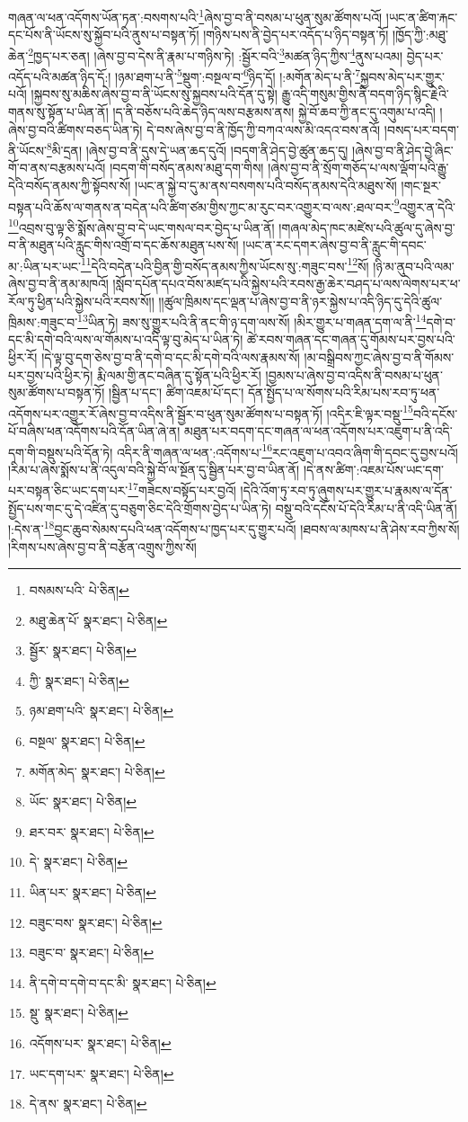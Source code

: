 གཞན་ལ་ཕན་འདོགས་ཡོན་ཏན་:བསགས་པའི་\footnote{བསམས་པའི་  པེ་ཅིན། }ཞེས་བྱ་བ་ནི་བསམ་པ་ཕུན་སུམ་ཚོགས་པའོ། །ཡང་ན་ཚིག་རྐང་དང་པོས་ནི་ཡོངས་སུ་སྐྱོབ་པའི་ནུས་པ་བསྟན་ཏོ། །གཉིས་པས་ནི་བྱེད་པར་འདོད་པ་ཉིད་བསྟན་ཏོ། །ཁྱོད་ཀྱི་:མཐུ་ཆེན་\footnote{མཐུ་ཆེན་པོ་  སྣར་ཐང་།  པེ་ཅིན། }ཁྱད་པར་ཅན། །ཞེས་བྱ་བ་དེས་ནི་རྣམ་པ་གཉིས་ཏེ། :སྦྱོར་བའི་\footnote{སྦྱོར་  སྣར་ཐང་།  པེ་ཅིན། }མཚན་ཉིད་ཀྱིས་\footnote{ཀྱི་  སྣར་ཐང་།  པེ་ཅིན། }ནུས་པའམ། བྱེད་པར་འདོད་པའི་མཚན་ཉིད་དོ:། །ཉམ་ཐག་པ་ནི་\footnote{ཉམ་ཐག་པའི་  སྣར་ཐང་།  པེ་ཅིན། }སྡུག་:བསྔལ་བ་\footnote{བསྔལ་  སྣར་ཐང་།  པེ་ཅིན། }ཉིད་དོ། །:མགོན་མེད་པ་ནི་\footnote{མགོན་མེད་  སྣར་ཐང་།  པེ་ཅིན། }སྐྱབས་མེད་པར་གྱུར་པའོ། །སྐྱབས་སུ་མཆིས་ཞེས་བྱ་བ་ནི་ཡོངས་སུ་སྐྱབས་པའི་དོན་དུ་སྟེ། རྒྱུ་འདི་གསུམ་གྱིས་ནི་བདག་ཉིད་སྙིང་རྗེའི་གནས་སུ་སྟོན་པ་ཡིན་ནོ། །ད་ནི་བཅོས་པའི་ཆེད་ཉིད་ལས་བརྩམས་ནས། སྐྱེ་བོ་ཆབ་ཀྱི་ནང་དུ་འགུམ་པ་འདི། །ཞེས་བྱ་བའི་ཚིགས་བཅད་ཡིན་ཏེ། དེ་བས་ཞེས་བྱ་བ་ནི་ཁྱོད་ཀྱི་བཀའ་ལས་མི་འདའ་བས་ནའོ། །བསད་པར་བདག་ནི་ཡོངས་\footnote{ཡོང་  སྣར་ཐང་།  པེ་ཅིན། }མི་དྲན། །ཞེས་བྱ་བ་ནི་དུས་དེ་ཡན་ཆད་དུའོ། །བདག་ནི་ཤེད་བྱེ་ཚུན་ཆད་དུ། །ཞེས་བྱ་བ་ནི་ཤེད་བྱེ་ཞིང་གོ་བ་ནས་བརྩམས་པའོ། །བདག་གི་བསོད་ནམས་མཐུ་དག་གིས། །ཞེས་བྱ་བ་ནི་སྲོག་གཅོད་པ་ལས་ལྡོག་པའི་རྒྱུ་དེའི་བསོད་ནམས་ཀྱི་སྟོབས་སོ། །ཡང་ན་སྐྱེ་བ་དུ་མ་ནས་བསགས་པའི་བསོད་ནམས་དེའི་མཐུས་སོ། །གང་སྔར་བསྟན་པའི་ཆོས་ལ་གནས་ན་བདེན་པའི་ཚིག་ཙམ་གྱིས་ཀྱང་མ་རུང་བར་འགྱུར་བ་ལས་:ཐལ་བར་\footnote{ཐར་བར་  སྣར་ཐང་།  པེ་ཅིན། }འགྱུར་ན་དེའི་\footnote{དེ་  སྣར་ཐང་།  པེ་ཅིན། }འབྲས་བུ་ལྟ་ཅི་སྨོས་ཞེས་བྱ་བ་དེ་ཡང་གསལ་བར་བྱེད་པ་ཡིན་ནོ། །གཞལ་མེད་ཁང་མཛེས་པའི་ཚུལ་དུ་ཞེས་བྱ་བ་ནི་མཐུན་པའི་རླུང་གིས་འགྲོ་བ་དང་ཆོས་མཐུན་པས་སོ། །ཡང་ན་རང་དགར་ཞེས་བྱ་བ་ནི་རླུང་གི་དབང་མ་:ཡིན་པར་ཡང་\footnote{ཡིན་པར་  སྣར་ཐང་།  པེ་ཅིན། }དེའི་བདེན་པའི་བྱིན་གྱི་བསོད་ནམས་ཀྱིས་ཡོངས་སུ་:གཟུང་བས་\footnote{བཟུང་བས་  སྣར་ཐང་།  པེ་ཅིན། }སོ། །ཉི་མ་ནུབ་པའི་ལམ་ཞེས་བྱ་བ་ནི་ནམ་མཁའོ། །སློབ་དཔོན་དཔའ་བོས་མཛད་པའི་སྐྱེས་པའི་རབས་རྒྱ་ཆེར་བཤད་པ་ལས་ལེགས་པར་ཕ་རོལ་ཏུ་ཕྱིན་པའི་སྐྱེས་པའི་རབས་སོ།། །།ཚུལ་ཁྲིམས་དང་ལྡན་པ་ཞེས་བྱ་བ་ནི་ཉར་སྐྱེས་པ་འདི་ཉིད་དུ་དེའི་ཚུལ་ཁྲིམས་:གཟུང་བ་\footnote{བཟུང་བ་  སྣར་ཐང་།  པེ་ཅིན། }ཡིན་ཏེ། ཟས་སུ་གྱུར་པའི་ནི་ནང་གི་ཉ་དག་ལས་སོ། །མིར་གྱུར་པ་གཞན་དག་ལ་ནི་\footnote{ནི་དགེ་བ་དགེ་བ་དང་མི་  སྣར་ཐང་།  པེ་ཅིན། }དགེ་བ་དང་མི་དགེ་བའི་ལས་ལ་གོམས་པ་འདི་ལྟ་བུ་མེད་པ་ཡིན་ཏེ། ཚེ་རབས་གཞན་དང་གཞན་དུ་གོམས་པར་བྱས་པའི་ཕྱིར་རོ། །དེ་ལྟ་བུ་དག་ཅེས་བྱ་བ་ནི་དགེ་བ་དང་མི་དགེ་བའི་ལས་རྣམས་སོ། །མ་བསྒྲིབས་ཀྱང་ཞེས་བྱ་བ་ནི་གོམས་པར་བྱས་པའི་ཕྱིར་ཏེ། རྨི་ལམ་གྱི་ནང་བཞིན་དུ་སྟོན་པའི་ཕྱིར་རོ། །བྱམས་པ་ཞེས་བྱ་བ་འདིས་ནི་བསམ་པ་ཕུན་སུམ་ཚོགས་པ་བསྟན་ཏོ། །སྦྱིན་པ་དང་། ཚིག་འཇམ་པོ་དང་། དོན་སྤྱོད་པ་ལ་སོགས་པའི་རིམ་པས་རབ་ཏུ་ཕན་འདོགས་པར་འགྱུར་རོ་ཞེས་བྱ་བ་འདིས་ནི་སྦྱོར་བ་ཕུན་སུམ་ཚོགས་པ་བསྟན་ཏོ། །འདིར་ཇི་ལྟར་བསྡུ་\footnote{སྡུ་  སྣར་ཐང་།  པེ་ཅིན། }བའི་དངོས་པོ་བཞིས་ཕན་འདོགས་པའི་དོན་ཡིན་ཞེ་ན། མཐུན་པར་བདག་དང་གཞན་ལ་ཕན་འདོགས་པར་འཇུག་པ་ནི་འདི་དག་གི་བསྡུས་པའི་དོན་ཏེ། འདིར་ནི་གཞན་ལ་ཕན་:འདོགས་པ་\footnote{འདོགས་པར་  སྣར་ཐང་།  པེ་ཅིན། }རང་འཇུག་པ་འབའ་ཞིག་གི་དབང་དུ་བྱས་པའོ། །རིམ་པ་ཞེས་སྨོས་པ་ནི་འདུལ་བའི་སྐྱེ་བོ་ལ་སྔོན་དུ་སྦྱིན་པར་བྱ་བ་ཡིན་ནོ། །དེ་ནས་ཚིག་:འཇམ་པོས་ཡང་དག་པར་བསྟན་ཅིང་ཡང་དག་པར་\footnote{ཡང་དག་པར་  སྣར་ཐང་།  པེ་ཅིན། }གཟེངས་བསྟོད་པར་བྱའོ། །དེའི་འོག་ཏུ་རབ་ཏུ་ཞུགས་པར་གྱུར་པ་རྣམས་ལ་དོན་སྤྱོད་པས་གང་དུ་དེ་འཛིན་དུ་བཅུག་ཅིང་དེའི་གྲོགས་བྱེད་པ་ཡིན་ཏེ། བསྡུ་བའི་དངོས་པོ་དེའི་རིམ་པ་ནི་འདི་ཡིན་ནོ། །:དེས་ན་\footnote{དེ་ནས་  སྣར་ཐང་།  པེ་ཅིན། }བྱང་ཆུབ་སེམས་དཔའི་ཕན་འདོགས་པ་ཁྱད་པར་དུ་གྱུར་པའོ། །ཐབས་ལ་མཁས་པ་ནི་ཤེས་རབ་ཀྱིས་སོ། །རིགས་པས་ཞེས་བྱ་བ་ནི་བརྩོན་འགྲུས་ཀྱིས་སོ། 